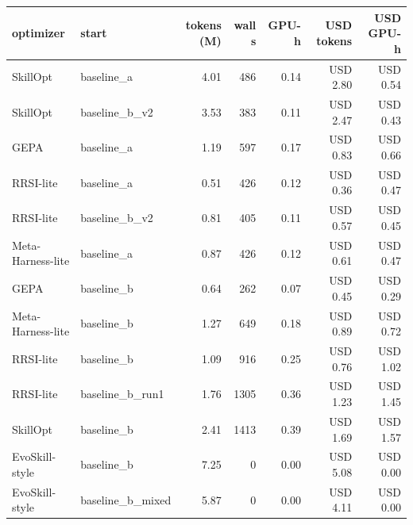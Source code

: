 \begin{tabular}{llrrrrr}
\toprule
optimizer & start & tokens (M) & wall s & GPU-h & USD tokens & USD GPU-h \\
\midrule
SkillOpt & baseline\_a & 4.01 & 486 & 0.14 & USD 2.80 & USD 0.54 \\
SkillOpt & baseline\_b\_v2 & 3.53 & 383 & 0.11 & USD 2.47 & USD 0.43 \\
GEPA & baseline\_a & 1.19 & 597 & 0.17 & USD 0.83 & USD 0.66 \\
RRSI-lite & baseline\_a & 0.51 & 426 & 0.12 & USD 0.36 & USD 0.47 \\
RRSI-lite & baseline\_b\_v2 & 0.81 & 405 & 0.11 & USD 0.57 & USD 0.45 \\
Meta-Harness-lite & baseline\_a & 0.87 & 426 & 0.12 & USD 0.61 & USD 0.47 \\
GEPA & baseline\_b & 0.64 & 262 & 0.07 & USD 0.45 & USD 0.29 \\
Meta-Harness-lite & baseline\_b & 1.27 & 649 & 0.18 & USD 0.89 & USD 0.72 \\
RRSI-lite & baseline\_b & 1.09 & 916 & 0.25 & USD 0.76 & USD 1.02 \\
RRSI-lite & baseline\_b\_run1 & 1.76 & 1305 & 0.36 & USD 1.23 & USD 1.45 \\
SkillOpt & baseline\_b & 2.41 & 1413 & 0.39 & USD 1.69 & USD 1.57 \\
EvoSkill-style & baseline\_b & 7.25 & 0 & 0.00 & USD 5.08 & USD 0.00 \\
EvoSkill-style & baseline\_b\_mixed & 5.87 & 0 & 0.00 & USD 4.11 & USD 0.00 \\
\bottomrule
\end{tabular}
